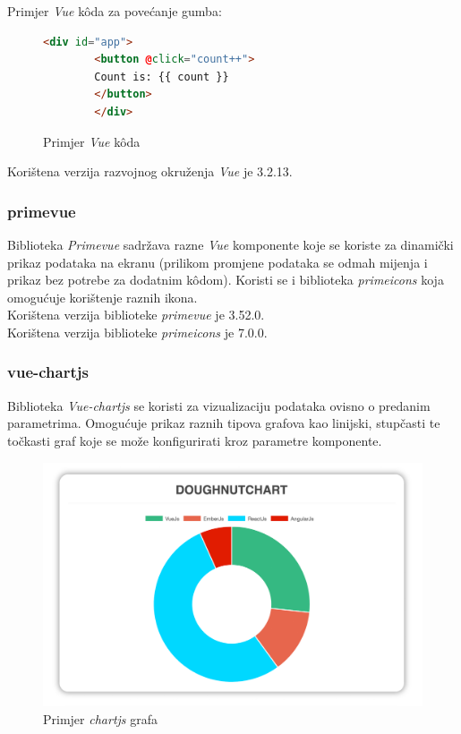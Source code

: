 \documentclass[zavrsnirad]{fer}
\begin{document}
Primjer \textit{Vue} kôda za povećanje gumba:
\begin{figure}[htb]
	\centering
	\begin{lstlisting}[language=html]
		<div id="app">
		<button @click="count++">
		Count is: {{ count }}
		</button>
		</div>
	\end{lstlisting}
	\caption{Primjer \textit{Vue} kôda \cite{vue_doc}}
\end{figure}
\FloatBarrier

Korištena verzija razvojnog okruženja \textit{Vue} je 3.2.13.

\subsubsection{primevue}
Biblioteka \textit{Primevue} sadržava razne \textit{Vue} komponente koje se koriste za dinamički prikaz podataka na ekranu (prilikom promjene podataka se odmah mijenja i prikaz bez potrebe za dodatnim kôdom). Koristi se i biblioteka \textit{primeicons} koja omogućuje korištenje raznih ikona.
\\Korištena verzija biblioteke \textit{primevue} je 3.52.0.
\\Korištena verzija biblioteke \textit{primeicons} je 7.0.0.

\subsubsection{vue-chartjs}
\label{pog:chart.vue}
Biblioteka \textit{Vue-chartjs} se koristi za vizualizaciju podataka ovisno o predanim parametrima. Omogućuje prikaz raznih tipova grafova kao linijski, stupčasti te točkasti graf koje se može konfigurirati kroz parametre komponente.
\begin{figure}[htb]
	\centering
	\includegraphics[width=0.9\linewidth]{images/chartjs_example.png} 
	\caption{Primjer \textit{chartjs} grafa \cite{chartjs_repo}}
	\label{slk:chartjs_example}
\end{figure}
\FloatBarrier
\end{document}
